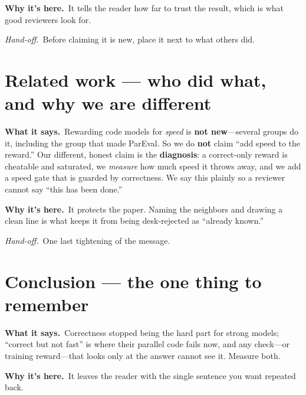 \documentclass[11pt]{article}
\newcommand{\handoff}[1]{\textit{Hand-off.}\ #1}
\newcommand{\says}[1]{\textbf{What it says.}\ #1}
\newcommand{\why}[1]{\textbf{Why it's here.}\ #1}
\begin{document}
\why{It tells the reader how far to trust the result, which is what good reviewers look
for.}

\handoff{Before claiming it is new, place it next to what others did.}

\section{Related work --- who did what, and why we are different}
\says{Rewarding code models for \emph{speed} is \textbf{not new}---several groups do it,
including the group that made ParEval. So we do \textbf{not} claim ``add speed to the
reward.'' Our different, honest claim is the \textbf{diagnosis}: a correct-only reward is
cheatable and saturated, we \emph{measure} how much speed it throws away, and we add a
speed gate that is guarded by correctness. We say this plainly so a reviewer cannot say
``this has been done.''}

\why{It protects the paper. Naming the neighbors and drawing a clean line is what keeps it
from being desk-rejected as ``already known.''}

\handoff{One last tightening of the message.}

\section{Conclusion --- the one thing to remember}
\says{Correctness stopped being the hard part for strong models; ``correct but not fast''
is where their parallel code fails now, and any check---or training reward---that looks
only at the answer cannot see it. Measure both.}

\why{It leaves the reader with the single sentence you want repeated back.}
\end{document}

